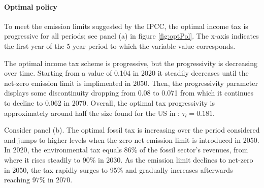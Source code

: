 \begin{figure}[h!!]
\end{figure} 

\paragraph{Optimal policy}
To meet the emission limits suggested by the IPCC, the optimal income tax is progressive for all periods; see panel (a) in figure \ref{fig:optPol}.  The x-axis indicates the first year of the 5 year period to which the variable value corresponds. 

The optimal income tax scheme is progressive, but the progressivity is decreasing over time. Starting from a value of 0.104 in 2020 it steadily decreases until the net-zero emission limit is implimented in 2050. Then, the progressivity parameter displays some discontinuity dropping from 0.08 to 0.071 from which it continues to decline to 0.062 in 2070.
Overall, the optimal tax progressivity is approximately  around half the size found for the US in \cite{Heathcote2017OptimalFramework}: $\tau_{l}=0.181$.


Consider panel (b). The optimal fossil tax is increasing over the period considered and jumps to higher levels when the zero-net emission limit is introduced in 2050.
In 2020, the environmental tax equals 86\% of the fossil sector's revenues, from where it rises steadily to 90\% in 2030.  As the emission limit declines to net-zero in 2050, the tax rapidly surges to 95\% and gradually increases afterwards reaching 97\% in 2070. 

